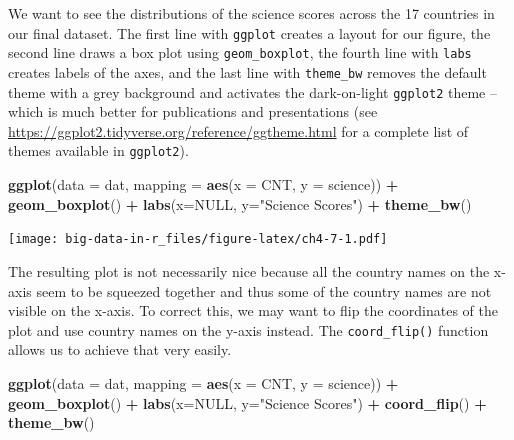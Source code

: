 \documentclass[]{book}
\newenvironment{Shaded}{\begin{snugshade}}{\end{snugshade}}
\newcommand{\DataTypeTok}[1]{\textcolor[rgb]{0.13,0.29,0.53}{#1}}
\newcommand{\KeywordTok}[1]{\textcolor[rgb]{0.13,0.29,0.53}{\textbf{#1}}}
\newcommand{\NormalTok}[1]{#1}
\newcommand{\OperatorTok}[1]{\textcolor[rgb]{0.81,0.36,0.00}{\textbf{#1}}}
\newcommand{\OtherTok}[1]{\textcolor[rgb]{0.56,0.35,0.01}{#1}}
\newcommand{\StringTok}[1]{\textcolor[rgb]{0.31,0.60,0.02}{#1}}
\begin{document}
We want to see the distributions of the science scores across the 17 countries in our final dataset. The first line with \texttt{ggplot} creates a layout for our figure, the second line draws a box plot using \texttt{geom\_boxplot}, the fourth line with \texttt{labs} creates labels of the axes, and the last line with \texttt{theme\_bw} removes the default theme with a grey background and activates the dark-on-light \texttt{ggplot2} theme -- which is much better for publications and presentations (see \url{https://ggplot2.tidyverse.org/reference/ggtheme.html} for a complete list of themes available in \texttt{ggplot2}).

\begin{Shaded}
\begin{Highlighting}[]
\KeywordTok{ggplot}\NormalTok{(}\DataTypeTok{data =}\NormalTok{ dat, }\DataTypeTok{mapping =} \KeywordTok{aes}\NormalTok{(}\DataTypeTok{x =}\NormalTok{ CNT, }\DataTypeTok{y =}\NormalTok{ science)) }\OperatorTok{+}
\StringTok{  }\KeywordTok{geom_boxplot}\NormalTok{() }\OperatorTok{+}
\StringTok{  }\KeywordTok{labs}\NormalTok{(}\DataTypeTok{x=}\OtherTok{NULL}\NormalTok{, }\DataTypeTok{y=}\StringTok{"Science Scores"}\NormalTok{) }\OperatorTok{+}
\StringTok{  }\KeywordTok{theme_bw}\NormalTok{()}
\end{Highlighting}
\end{Shaded}

\texttt{[image: big-data-in-r\_files/figure-latex/ch4-7-1.pdf]}

The resulting plot is not necessarily nice because all the country names on the x-axis seem to be squeezed together and thus some of the country names are not visible on the x-axis. To correct this, we may want to flip the coordinates of the plot and use country names on the y-axis instead. The \texttt{coord\_flip()} function allows us to achieve that very easily.

\begin{Shaded}
\begin{Highlighting}[]
\KeywordTok{ggplot}\NormalTok{(}\DataTypeTok{data =}\NormalTok{ dat,}
       \DataTypeTok{mapping =} \KeywordTok{aes}\NormalTok{(}\DataTypeTok{x =}\NormalTok{ CNT, }\DataTypeTok{y =}\NormalTok{ science)) }\OperatorTok{+}
\StringTok{  }\KeywordTok{geom_boxplot}\NormalTok{() }\OperatorTok{+}
\StringTok{  }\KeywordTok{labs}\NormalTok{(}\DataTypeTok{x=}\OtherTok{NULL}\NormalTok{, }\DataTypeTok{y=}\StringTok{"Science Scores"}\NormalTok{) }\OperatorTok{+}
\StringTok{  }\KeywordTok{coord_flip}\NormalTok{() }\OperatorTok{+}
\StringTok{  }\KeywordTok{theme_bw}\NormalTok{()}
\end{Highlighting}
\end{Shaded}
\end{document}
